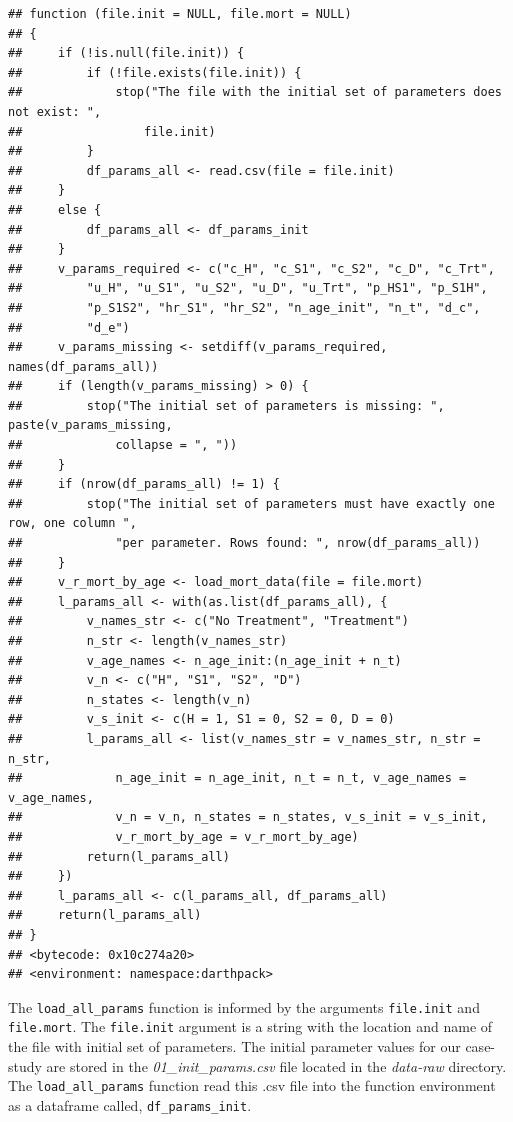 \documentclass[
]{book}
\begin{document}
\begin{verbatim}
## function (file.init = NULL, file.mort = NULL) 
## {
##     if (!is.null(file.init)) {
##         if (!file.exists(file.init)) {
##             stop("The file with the initial set of parameters does not exist: ", 
##                 file.init)
##         }
##         df_params_all <- read.csv(file = file.init)
##     }
##     else {
##         df_params_all <- df_params_init
##     }
##     v_params_required <- c("c_H", "c_S1", "c_S2", "c_D", "c_Trt", 
##         "u_H", "u_S1", "u_S2", "u_D", "u_Trt", "p_HS1", "p_S1H", 
##         "p_S1S2", "hr_S1", "hr_S2", "n_age_init", "n_t", "d_c", 
##         "d_e")
##     v_params_missing <- setdiff(v_params_required, names(df_params_all))
##     if (length(v_params_missing) > 0) {
##         stop("The initial set of parameters is missing: ", paste(v_params_missing, 
##             collapse = ", "))
##     }
##     if (nrow(df_params_all) != 1) {
##         stop("The initial set of parameters must have exactly one row, one column ", 
##             "per parameter. Rows found: ", nrow(df_params_all))
##     }
##     v_r_mort_by_age <- load_mort_data(file = file.mort)
##     l_params_all <- with(as.list(df_params_all), {
##         v_names_str <- c("No Treatment", "Treatment")
##         n_str <- length(v_names_str)
##         v_age_names <- n_age_init:(n_age_init + n_t)
##         v_n <- c("H", "S1", "S2", "D")
##         n_states <- length(v_n)
##         v_s_init <- c(H = 1, S1 = 0, S2 = 0, D = 0)
##         l_params_all <- list(v_names_str = v_names_str, n_str = n_str, 
##             n_age_init = n_age_init, n_t = n_t, v_age_names = v_age_names, 
##             v_n = v_n, n_states = n_states, v_s_init = v_s_init, 
##             v_r_mort_by_age = v_r_mort_by_age)
##         return(l_params_all)
##     })
##     l_params_all <- c(l_params_all, df_params_all)
##     return(l_params_all)
## }
## <bytecode: 0x10c274a20>
## <environment: namespace:darthpack>
\end{verbatim}

The \texttt{load\_all\_params} function is informed by the arguments \texttt{file.init} and \texttt{file.mort}. The \texttt{file.init} argument is a string with the location and name of the file with initial set of parameters. The initial parameter values for our case-study are stored in the \emph{01\_init\_params.csv} file located in the \emph{data-raw} directory. The \texttt{load\_all\_params} function read this .csv file into the function environment as a dataframe called, \texttt{df\_params\_init}.
\end{document}
